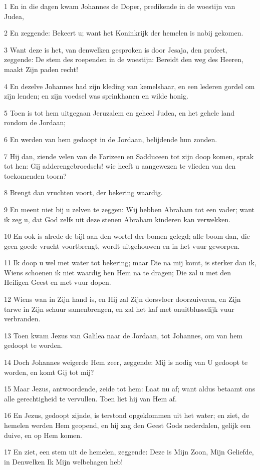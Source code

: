 \par 1 En in die dagen kwam Johannes de Doper, predikende in de woestijn van Judea,
\par 2 En zeggende: Bekeert u; want het Koninkrijk der hemelen is nabij gekomen.
\par 3 Want deze is het, van denwelken gesproken is door Jesaja, den profeet, zeggende: De stem des roependen in de woestijn: Bereidt den weg des Heeren, maakt Zijn paden recht!
\par 4 En dezelve Johannes had zijn kleding van kemelshaar, en een lederen gordel om zijn lenden; en zijn voedsel was sprinkhanen en wilde honig.
\par 5 Toen is tot hem uitgegaan Jeruzalem en geheel Judea, en het gehele land rondom de Jordaan;
\par 6 En werden van hem gedoopt in de Jordaan, belijdende hun zonden.
\par 7 Hij dan, ziende velen van de Farizeen en Sadduceen tot zijn doop komen, sprak tot hen: Gij adderengebroedsels! wie heeft u aangewezen te vlieden van den toekomenden toorn?
\par 8 Brengt dan vruchten voort, der bekering waardig.
\par 9 En meent niet bij u zelven te zeggen: Wij hebben Abraham tot een vader; want ik zeg u, dat God zelfs uit deze stenen Abraham kinderen kan verwekken.
\par 10 En ook is alrede de bijl aan den wortel der bomen gelegd; alle boom dan, die geen goede vrucht voortbrengt, wordt uitgehouwen en in het vuur geworpen.
\par 11 Ik doop u wel met water tot bekering; maar Die na mij komt, is sterker dan ik, Wiens schoenen ik niet waardig ben Hem na te dragen; Die zal u met den Heiligen Geest en met vuur dopen.
\par 12 Wiens wan in Zijn hand is, en Hij zal Zijn dorsvloer doorzuiveren, en Zijn tarwe in Zijn schuur samenbrengen, en zal het kaf met onuitblusselijk vuur verbranden.
\par 13 Toen kwam Jezus van Galilea naar de Jordaan, tot Johannes, om van hem gedoopt te worden.
\par 14 Doch Johannes weigerde Hem zeer, zeggende: Mij is nodig van U gedoopt te worden, en komt Gij tot mij?
\par 15 Maar Jezus, antwoordende, zeide tot hem: Laat nu af; want aldus betaamt ons alle gerechtigheid te vervullen. Toen liet hij van Hem af.
\par 16 En Jezus, gedoopt zijnde, is terstond opgeklommen uit het water; en ziet, de hemelen werden Hem geopend, en hij zag den Geest Gods nederdalen, gelijk een duive, en op Hem komen.
\par 17 En ziet, een stem uit de hemelen, zeggende: Deze is Mijn Zoon, Mijn Geliefde, in Denwelken Ik Mijn welbehagen heb!


